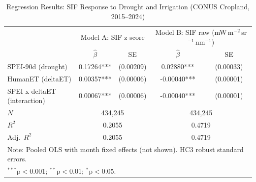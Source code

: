 \begin{table}[htbp]
\centering
\caption{Regression Results: SIF Response to Drought and Irrigation (CONUS Cropland, 2015--2024)}
\label{tab:sif_regression}
\begin{tabular}{lcccc}
\hline
 & \multicolumn{2}{c}{Model A: SIF z-score} & \multicolumn{2}{c}{Model B: SIF raw (mW\,m$^{-2}$\,sr$^{-1}$\,nm$^{-1}$)} \\
 & $\hat{\beta}$ & SE & $\hat{\beta}$ & SE \\
\hline
SPEI-90d (drought) & 0.17264*** & (0.00209) & 0.02880*** & (0.00033) \\
HumanET (deltaET) & 0.00357*** & (0.00006) & -0.00040*** & (0.00001) \\
SPEI x deltaET (interaction) & 0.00067*** & (0.00006) & -0.00040*** & (0.00001) \\
\hline
$N$ & \multicolumn{2}{c}{434,245} & \multicolumn{2}{c}{434,245} \\
$R^2$ & \multicolumn{2}{c}{0.2055} & \multicolumn{2}{c}{0.4719} \\
Adj.\ $R^2$ & \multicolumn{2}{c}{0.2055} & \multicolumn{2}{c}{0.4719} \\
\hline
\multicolumn{5}{l}{\footnotesize Note: Pooled OLS with month fixed effects (not shown). HC3 robust standard errors.} \\
\multicolumn{5}{l}{\footnotesize $^{***}$p$<$0.001; $^{**}$p$<$0.01; $^{*}$p$<$0.05.} \\
\end{tabular}
\end{table}